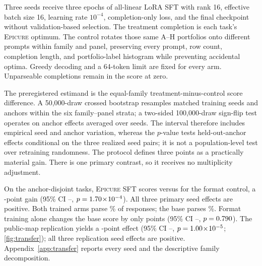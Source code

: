 \documentclass{article}
\newcommand{\epicure}{\textsc{Epicure}}
\begin{document}
Three seeds receive three epochs of all-linear LoRA SFT \citep{hu2022lora} with rank 16, effective
batch size 16, learning rate $10^{-4}$, completion-only loss, and the final checkpoint without
validation-based selection. The treatment completion is each task's \epicure{} optimum. The control
rotates those same A--H portfolios onto different prompts within family and panel, preserving every
prompt, row count, completion length, and portfolio-label histogram while preventing accidental
optima. Greedy decoding and a 64-token limit are fixed for every arm. Unparseable completions remain
in the score at zero.

The preregistered estimand is the equal-family treatment-minus-control score difference. A
50,000-draw crossed bootstrap resamples matched training seeds and anchors within the six
family--panel strata; a two-sided 100,000-draw sign-flip test operates on anchor effects averaged
over seeds. The interval therefore includes empirical seed and anchor variation, whereas the
$p$-value tests held-out-anchor effects conditional on the three realized seed pairs; it is not a
population-level test over retraining randomness. The protocol defines three points as a
practically material gain. There is one primary contrast, so it receives no multiplicity
adjustment.

\begin{table}[t]
  \caption{Reward transfer. Scores average three training seeds except the unmodified base.
  $\Delta$ is Epicure SFT minus format control; the public-map row is a declared secondary
  replication opened only after the primary analysis was sealed.}
  \label{tab:transfer}
  \centering
  \scriptsize
  \resizebox{\linewidth}{!}{}
\end{table}

On the \FBTransferPrimaryTasks{} anchor-disjoint tasks, \epicure{} SFT scores
\FBTransferPrimaryTreatment{} versus \FBTransferPrimaryControl{} for the format control, a
\FBTransferPrimaryGain{}-point gain (95\% CI
\FBTransferPrimaryCILow{}--\FBTransferPrimaryCIHigh{}, $p=1.70\!\times\!10^{-4}{}$). All three
primary seed effects are positive. Both trained arms parse \FBTransferPrimaryControlParse{}\% of responses;
the base parses \FBTransferPrimaryBaseParse{}\%. Format training alone changes the base score by
only \FBTransferPrimaryControlBaseGain{} points (95\% CI
\FBTransferPrimaryControlBaseCILow{}--\FBTransferPrimaryControlBaseCIHigh{},
$p=0.790{}$). The public-map replication yields a
\FBTransferPublicGain{}-point effect (95\% CI
\FBTransferPublicCILow{}--\FBTransferPublicCIHigh{}, $p=1.00\!\times\!10^{-5}{}$;
\cref{fig:transfer}); all three replication seed effects are positive. Appendix~\ref{app:transfer}
reports every seed and the descriptive family decomposition.
\end{document}
